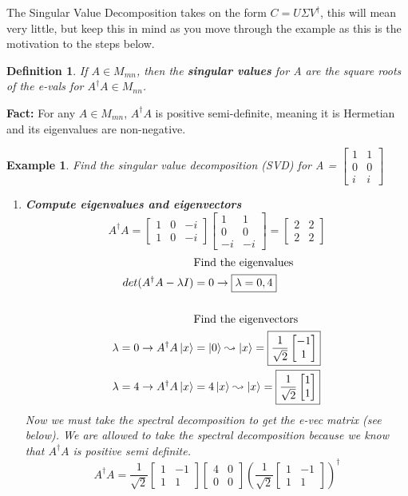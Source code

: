 \documentclass[12pt]{article}
\theoremstyle{plain}
\theoremstyle{nonumberplain}
\theoremstyle{plain}
\newtheorem{definition}[lemma]{Definition}
\newtheorem{example}[lemma]{Example}
\theoremstyle{nonumberplain}
\newcommand\1{{\bf 1}}
\newcommand{\bmat}[1]{\begin{bmatrix*} #1 \end{bmatrix*}} %
\newcommand{\<}{\left\langle}
\renewcommand{\>}{\right\rangle}
\begin{document}
The Singular Value Decomposition takes on the form $C = U \Sigma V^\dagger$, this will mean very little, but keep this in mind as you move through the example as this is the motivation to the steps below. 

\begin{definition}
If $A \in M_{mn}$, then the \textbf{singular values} for A are the square roots of the e-vals for $A^\dagger A \in M_{nn}$.
\end{definition}

\textbf{Fact:} For any $A \in M_{mn}$, $A^\dagger A$ is positive semi-definite, meaning it is Hermetian and its eigenvalues are non-negative.

\begin{example} Find the singular value decomposition (SVD) for A = $\bmat{1 &1\\ 0 &0\\ i &i}$
\begin{enumerate}
\item \textbf{Compute eigenvalues and eigenvectors}
\begin{equation}
A^\dagger A = \bmat{1 &0 &-i\\ 1 &0 &-i}\bmat{1 &1\\0 &0\\-i &-i} = \bmat{2 &2\\2 &2}
\end{equation}
\begin{align*}
&\text{Find the eigenvalues}\\
det(A^\dagger A -\lambda I) &= 0 \rightarrow \boxed{\lambda = 0, 4}\\
\\
&\text{Find the eigenvectors}\\ 
\lambda = 0 \rightarrow A^\dagger A \ket{x} &= \ket{0} \leadsto \ket{x} = \boxed{\frac{1}{\sqrt{2}}\bmat{-1\\1}}\\
\lambda = 4 \rightarrow A^\dagger A \ket{x} &= 4\ket{x} \leadsto \ket{x} = \boxed{\frac{1}{\sqrt{2}}\bmat{1\\1}}
\end{align*}
Now we must take the spectral decomposition to get the e-vec matrix (see below).  We are allowed to take the spectral decomposition because we know that $A^\dagger A$ is positive semi definite.\\
\begin{equation}
A^\dagger A = \boxed{\frac{1}{\sqrt{2}} \bmat{1 &-1\\1 &1}} \bmat{4&0\\0&0}(\frac{1}{\sqrt{2}}\bmat{1&-1\\1&1})^\dagger

\end{equation}
\end{enumerate}
\end{example}
\end{document}
